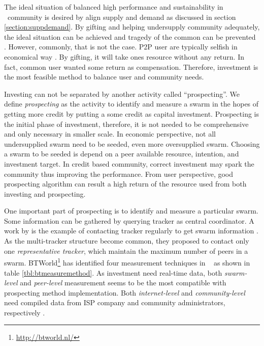 The ideal situation of balanced high performance and sustainability in \bt~community is desired by align supply and demand as discussed in section \ref{section:suppdemand}. By gifting and helping undersupply community adequately, the ideal situation can be achieved and tragedy of the common can be prevented \cite{2002:reputationtotragedy:milinski}. However, commonly, that is not the case. P2P user are typically selfish in economical way \cite{2014:userbehaviourprivate:jia}. By gifting, it will take ones resource without any return. In fact, common user wanted some return as compensation. Therefore, investment is the most feasible method to balance user and community needs.

Investing can not be separated by another activity called ``prospecting''. We define \textit{prospecting} as the activity to identify and measure a swarm in the hopes of getting more credit by putting a some credit as capital investment. Prospecting is the initial phase of investment, therefore, it is not needed to be comprehensive and only necessary in smaller scale. In economic perspective, not all undersupplied swarm need to be seeded, even more oversupplied swarm. Choosing a swarm to be seeded is depend on a peer available resource, intention, and investment target. In credit based community, correct investment may spark the community thus improving the performance. From user perspective, good prospecting algorithm can result a high return of the resource used from both investing and prospecting.

One important part of prospecting is to identify and measure a particular swarm. Some information can be gathered by querying tracker as central coordinator. A work by \citeauthor{2011:yoshida:crawlbtnet} is the example of contacting tracker regularly to get swarm information \cite{2011:yoshida:crawlbtnet}. As the multi-tracker structure become common, they proposed to contact only one \textit{representative tracker}, which maintain the maximum number of peers in a swarm. BTWorld\footnote{\url{http://btworld.nl/}} has identified four measurement techniques in \bt~\cite{2010:btworld:wojciechowski} as shown in table \ref{tbl:btmeasuremethod}. As investment need real-time data, both \textit{swarm-level} and \textit{peer-level} measurement seems to be the most compatible with prospecting method implementation. Both \textit{internet-level} and \textit{community-level} need compiled data from ISP company and community administrators, respectively . 

